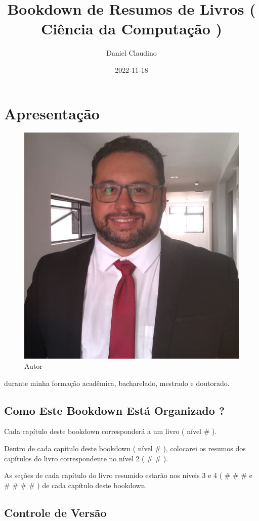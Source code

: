 \documentclass[
]{book}
\title{Bookdown de Resumos de Livros ( Ciência da Computação )}
\author{Daniel Claudino}
\date{2022-11-18}
\begin{document}
\maketitle

{
\setcounter{tocdepth}{1}
\tableofcontents
}
\hypertarget{apresentauxe7uxe3o}{%
\chapter{Apresentação}\label{apresentauxe7uxe3o}}

\begin{figure}

{\centering \includegraphics[width=0.5\linewidth]{imagens/FOTO-PERFIL-DANIEL-CLAUDINO-2020} 

}

\caption{Autor}\label{fig:unnamed-chunk-1}
\end{figure}

durante minha formação acadêmica, bacharelado, mestrado e doutorado.

\hypertarget{como-este-bookdown-estuxe1-organizado}{%
\section{Como Este Bookdown Está Organizado ?}\label{como-este-bookdown-estuxe1-organizado}}

Cada capítulo deste bookdown corresponderá a um livro ( nível \# ).

Dentro de cada capítulo deste bookdown ( nível \# ), colocarei os resumos dos capítulos do livro correspondente no nível 2 ( \# \# ).

As seções de cada capítulo do livro resumido estarão nos níveis 3 e 4 ( \# \# \# e \# \# \# \# ) de cada capítulo deste bookdown.

\hypertarget{controle-de-versuxe3o}{%
\section{Controle de Versão}\label{controle-de-versuxe3o}}
\end{document}
